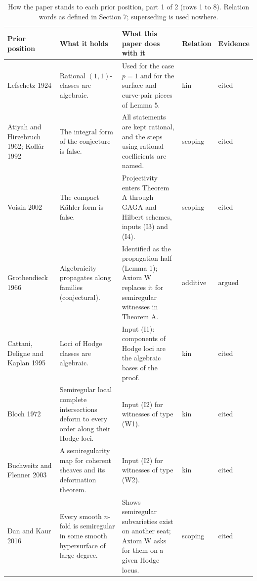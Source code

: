 \documentclass[10pt,twocolumn]{article}
\begin{document}
\begin{table}[t]
\centering\scriptsize\setlength{\tabcolsep}{3pt}\renewcommand{\arraystretch}{1.15}
\caption{How the paper stands to each prior position, part 1 of 2 (rows 1 to 8). Relation words as defined in Section 7; superseding is used nowhere.}
\begin{tabular}{@{}p{}p{}p{}p{}p{}@{}}
\toprule
Prior position & What it holds & What this paper does with it & Relation & Evidence \\
\midrule
Lefschetz 1924 & Rational $(1,1)$-classes are algebraic. & Used for the case $p=1$ and for the surface and curve-pair pieces of Lemma 5. & kin & cited \\
Atiyah and Hirzebruch 1962; Kollár 1992 & The integral form of the conjecture is false. & All statements are kept rational, and the steps using rational coefficients are named. & scoping & cited \\
Voisin 2002 & The compact Kähler form is false. & Projectivity enters Theorem A through GAGA and Hilbert schemes, inputs (I3) and (I4). & scoping & cited \\
Grothendieck 1966 & Algebraicity propagates along families (conjectural). & Identified as the propagation half (Lemma 1); Axiom W replaces it for semiregular witnesses in Theorem A. & additive & argued \\
Cattani, Deligne and Kaplan 1995 & Loci of Hodge classes are algebraic. & Input (I1): components of Hodge loci are the algebraic bases of the proof. & kin & cited \\
Bloch 1972 & Semiregular local complete intersections deform to every order along their Hodge loci. & Input (I2) for witnesses of type (W1). & kin & cited \\
Buchweitz and Flenner 2003 & A semiregularity map for coherent sheaves and its deformation theorem. & Input (I2) for witnesses of type (W2). & kin & cited \\
Dan and Kaur 2016 & Every smooth $n$-fold is semiregular in some smooth hypersurface of large degree. & Shows semiregular subvarieties exist on another seat; Axiom W asks for them on a given Hodge locus. & scoping & cited \\
\bottomrule
\end{tabular}
\end{table}
\end{document}
